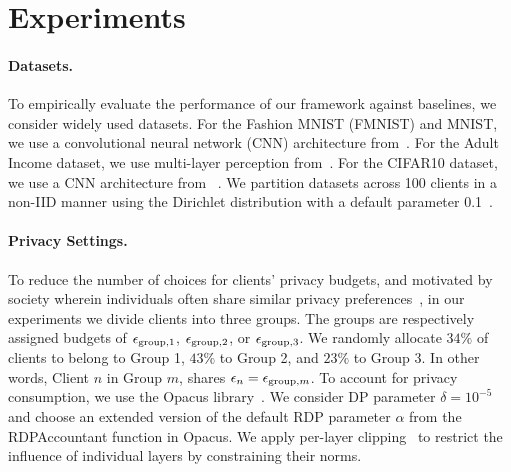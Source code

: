 \section{Experiments}\label{sec:simulation}
\paragraph{Datasets.}
To empirically evaluate the performance of our framework against baselines, we consider widely used datasets. For the Fashion MNIST (FMNIST) and MNIST, we use a convolutional neural network (CNN) architecture from~\citep{mcmahan2017communication}. For the Adult Income dataset, we use multi-layer perception from~\citep{9378043}. %
{For the CIFAR10 dataset, we use a CNN architecture from ~\cite{he2016deep}}. We partition datasets across 100 clients in a non-IID manner using the Dirichlet distribution with a default parameter 0.1~\citep{zhang2023fedala}. 

\paragraph{Privacy Settings.} To reduce the number of choices for clients' privacy budgets, and motivated by society wherein individuals often share similar privacy preferences~\citep{alaggan2015heterogeneous, boenisch2024have}, in our experiments we divide clients into three groups. The groups are respectively assigned budgets of ${\epsilon}_{\text{group}, 1}$, ${\epsilon}_{\text{group}, 2}$, or ${\epsilon}_{\text{group}, 3}$. We randomly allocate $34\%$ of clients to belong to Group 1, $43\%$ to Group 2, and $23\%$ to Group 3. In other words, Client $n$ in Group $m$, shares ${\epsilon}_n={\epsilon}_{\text{group},m}$. To account for privacy consumption, we use the Opacus library~\citep{opacus}. We consider DP parameter $\delta=10^{-5}$ and choose an extended version of the default RDP parameter $\alpha$ from the RDPAccountant function in Opacus. We apply per-layer clipping~\citep{mcmahan2017learning} to restrict the influence of individual layers by constraining their norms. 


